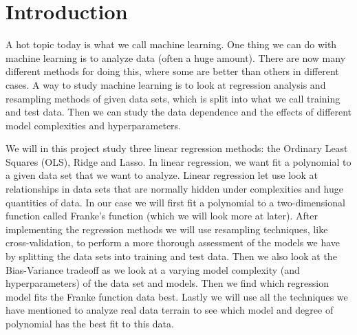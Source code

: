 \documentclass[12pt,a4paper,english]{article}
\begin{document}
\section{Introduction}
A hot topic today is what we call machine learning. One thing we can do with machine learning is to analyze data (often a huge amount). There are now many different methods for doing this, where some are better than others in different cases. A way to study machine learning is to look at regression analysis and resampling methods of given data sets, which is split into what we call training and test data. Then we can study the data dependence and the effects of different model complexities and hyperparameters.

We will in this project study three linear regression methods: the Ordinary Least Squares (OLS), Ridge and Lasso. In linear regression, we want fit a polynomial to a given data set that we want to analyze. Linear regression let use look at relationships in data sets that are normally hidden under complexities and huge quantities of data. In our case we will first fit a polynomial to a two-dimensional function called Franke's function (which we will look more at later). After implementing the regression methods we will use resampling techniques, like cross-validation, to perform a more thorough assessment of the models we have by splitting the data sets into training and test data. Then we also look at the Bias-Variance tradeoff as we look at a varying model complexity (and hyperparameters) of the data set and models. Then we find which regression model fits the Franke function data best. Lastly we will use all the techniques we have mentioned to analyze real data terrain to see which model and degree of polynomial has the best fit to this data.
\end{document}
